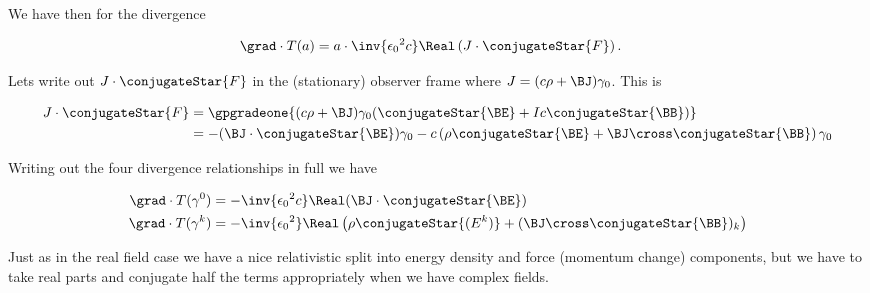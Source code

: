 We have then for the divergence

\begin{align}\label{eqn:complexFieldEnergy:10}
\grad \cdot T(a) 
&= a \cdot \inv{ {\epsilon_0}^2 c } \Real \left( J \cdot \conjugateStar{F} \right).
\end{align}

Lets write out $J \cdot \conjugateStar{F}$ in the (stationary) observer frame where $J = (c\rho + \BJ) \gamma_0$.  This is

\begin{align*}
J \cdot \conjugateStar{F} 
&=
\gpgradeone{ (c\rho + \BJ) \gamma_0 ( \conjugateStar{\BE} + I c \conjugateStar{\BB} ) } \\
&=
- (\BJ \cdot \conjugateStar{\BE} ) \gamma_0
- c \left( 
\rho \conjugateStar{\BE} 
+ \BJ \cross \conjugateStar{\BB}
\right) \gamma_0
\end{align*}

Writing out the four divergence relationships in full we have

\begin{subequations}
\begin{align}\label{eqn:complexFieldEnergy:11}
\grad \cdot T(\gamma^0) &= - \inv{ {\epsilon_0}^2 c } \Real( \BJ \cdot \conjugateStar{\BE} ) \\
\grad \cdot T(\gamma^k) &= - \inv{ {\epsilon_0}^2 } \Real \left( \rho \conjugateStar{(E^k)} + (\BJ \cross \conjugateStar{\BB})_k \right)
\end{align}
\end{subequations}

Just as in the real field case we have a nice relativistic split into energy density and force (momentum change) components, but we have to take real parts and conjugate half the terms appropriately when we have complex fields.

\EndArticle
